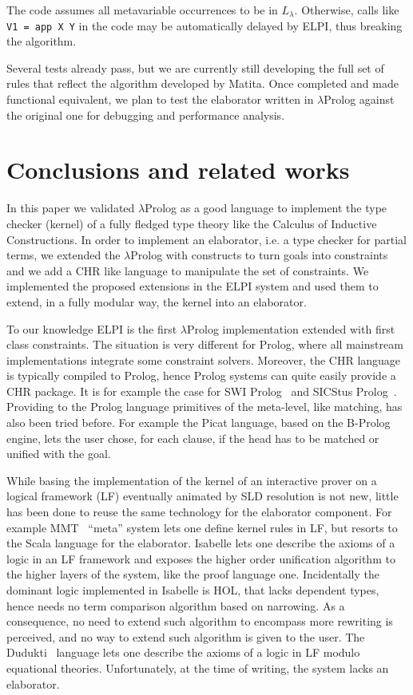 \documentclass{easychair}
\begin{document}
The code assumes all metavariable occurrences to be in $L_\lambda$. Otherwise, calls like \verb+V1 = app X Y+ in the code may be automatically delayed by ELPI, thus breaking the algorithm.

Several tests already pass, but we are currently still developing the full set of rules that reflect the algorithm developed by Matita. Once completed and made functional equivalent, we plan to test the elaborator written in $\lambda$Prolog against the original one for debugging and performance analysis.

\section{Conclusions and related works}\label{sec:conclusion}

In this paper we validated $\lambda$Prolog as a good language to implement
the type checker (kernel) of a fully fledged type theory like the Calculus of
Inductive Constructions.  In order to implement an elaborator, i.e. a type
checker for partial terms, we extended the $\lambda$Prolog with constructs to
turn goals into constraints and we add a CHR like language to manipulate
the set of constraints.  We implemented the proposed extensions in the ELPI
system and used them to extend, in a fully modular way, the kernel into an elaborator.

To our knowledge ELPI is the first $\lambda$Prolog implementation extended
with first class constraints.  The situation is very different for Prolog, where all
mainstream implementations integrate some constraint solvers.  Moreover,
the CHR language is typically compiled to Prolog, hence Prolog systems
can quite easily provide a CHR package.  It is for example the case for
SWI Prolog~\cite{SWI} and SICStus Prolog~\cite{SICStus}.  Providing to
the Prolog language primitives of the meta-level, like matching, has also
been tried before.  For example the Picat language, based on the
B-Prolog~\cite{Bprolog} engine, lets the user chose, for each clause,
if the head has to be matched or unified with the goal.

While basing the implementation of the kernel of an interactive prover on a
logical framework (LF) eventually animated by SLD resolution is not new, 
little has been done to reuse the same technology for the elaborator
component.  For example MMT~\cite{mmt} ``meta'' system lets one define kernel
rules in LF, but resorts to the Scala language for the elaborator.
Isabelle lets one describe the axioms of a logic in an LF framework and
exposes the higher order unification algorithm to the higher layers of
the system, like the proof language one.  Incidentally the dominant
logic implemented in Isabelle is HOL, that lacks dependent types, hence
needs no term comparison algorithm based on narrowing.  As a consequence,
no need to extend such algorithm to encompass more rewriting is perceived,
and no way to extend such algorithm is given to the user.
The Dudukti~\cite{dedukti} language lets one describe the axioms of a logic
in LF modulo equational theories.  Unfortunately, at the time of writing,
the system lacks an elaborator.
\end{document}
